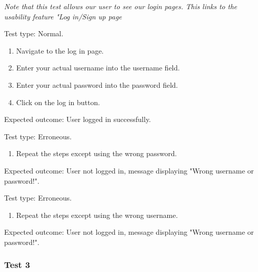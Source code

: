 {\textit{Note that this test allows our user to see our login pages. This links to the usability feature
"Log in/Sign up page}} \\ \vspace{0.2cm}

{\sffamily Test type: Normal.}\\

\begin{enumerate}
  \item Navigate to the log in page.
  \item Enter your actual username into the username field.
  \item Enter your actual password into the password field.
  \item Click on the log in button.
\end{enumerate}

{\sffamily Expected outcome:} User logged in successfully. \\

{\color{gray} \hrulefill}

{\sffamily Test type: Erroneous.}\\

\begin{enumerate}
  \item Repeat the steps except using the wrong password.
\end{enumerate}

{\sffamily Expected outcome:} User not logged in,
message displaying "Wrong username or password!". \\

{\color{gray} \hrulefill}

{\sffamily Test type: Erroneous.}\\

\begin{enumerate}
  \item Repeat the steps except using the wrong username.
\end{enumerate}

{\sffamily Expected outcome:} User not logged in,
message displaying "Wrong username or password!". \\

{\color{gray} \hrulefill}

\vspace{0.2cm}

\subsubsection{Test 3}

